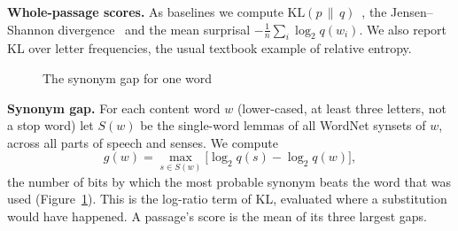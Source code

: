 \documentclass[10pt,journal,compsoc]{IEEEtran}
\newcommand{\KL}{\mathrm{KL}}
\begin{document}
\textbf{Whole-passage scores.} As baselines we compute $\KL(p\,\|\,q)$~\cite{kullback1951}, the Jensen--Shannon divergence~\cite{lin1991js} and the mean surprisal $-\frac{1}{n}\sum_i \log_2 q(w_i)$. We also report KL over letter frequencies, the usual textbook example of relative entropy.

\begin{figure}[t]
\centering
{}
\caption{The synonym gap for one word}\label{fig:gap}
\end{figure}

\textbf{Synonym gap.} For each content word $w$ (lower-cased, at least three letters, not a stop word) let $S(w)$ be the single-word lemmas of all WordNet synsets of $w$, across all parts of speech and senses. We compute
\begin{equation}
g(w)=\max_{s\in S(w)}\big[\log_2 q(s)-\log_2 q(w)\big],
\end{equation}
the number of bits by which the most probable synonym beats the word that was used (Figure~\ref{fig:gap}). This is the log-ratio term of KL, evaluated where a substitution would have happened. A passage's score is the mean of its three largest gaps.
\end{document}
